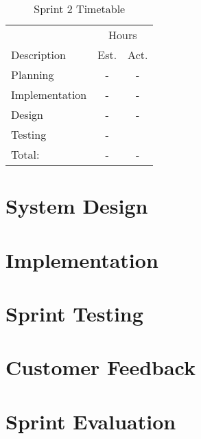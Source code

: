 \begin{table}[ht] \small \center
\caption{Sprint 2 Timetable}
\begin{tabularx}{\textwidth}{X c c}
	\toprule
	 & \multicolumn{2}{c}{Hours} \\
	\cmidrule(r){2-3}
	 Description & Est. & Act. \\
	\midrule
	Planning & - & -\\
	\addlinespace
	Implementation & - & -\\
	\addlinespace
	Design & - & -\\
	\addlinespace
	Testing & - & \\
	\midrule
	Total: & - & - \\
	\bottomrule
\end{tabularx}
\end{table}


\section{System Design}


\section{Implementation}


\section{Sprint Testing}


\section{Customer Feedback}


\section{Sprint Evaluation}


